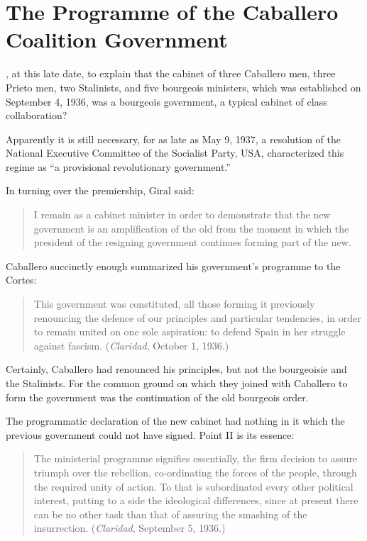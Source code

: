 \chapter{The Programme of the Caballero Coalition Government}

, at this late date, to explain that the cabinet of three Caballero men, three Prieto men, two Stalinists, and five bourgeois ministers, which was established on September 4, 1936, was a bourgeois government, a typical cabinet of class collaboration?

Apparently it is still necessary, for as late as May 9, 1937, a resolution of the National Executive Committee of the Socialist Party, USA, characterized this regime as ``a provisional revolutionary government.''

In turning over the premiership, Giral said:

\begin{quotation}
  I remain as a cabinet minister in order to demonstrate that the new government is an amplification of the old from the moment in which the president of the resigning government continues forming part of the new.
\end{quotation}

Caballero succinctly enough summarized his government’s programme to the Cortes:

\begin{quotation}
  This government was constituted, all those forming it previously renouncing the defence of our principles and particular tendencies, in order to remain united on one sole aspiration: to defend Spain in her struggle against fascism. (\emph{Claridad}, October 1, 1936.)
\end{quotation}

Certainly, Caballero had renounced his principles, but not the bourgeoisie and the Stalinists. For the common ground on which they joined with Caballero to form the government was the continuation of the old bourgeois order.

The programmatic declaration of the new cabinet had nothing in it which the previous government could not have signed. Point II is its essence:

\begin{quotation}
  The ministerial programme signifies essentially, the firm decision to assure triumph over the rebellion, co-ordinating the forces of the people, through the required unity of action. To that is subordinated every other political interest, putting to a side the ideological differences, since at present there can be no other task than that of assuring the smashing of the insurrection. (\emph{Claridad}, September 5, 1936.)
\end{quotation}

